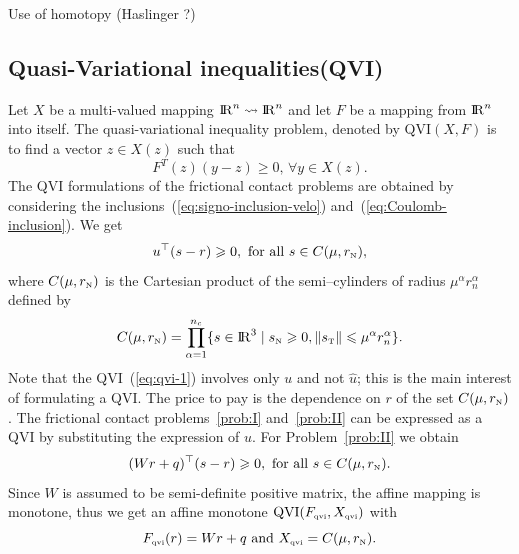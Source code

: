 \begin{ndrva}
  Use of homotopy (Haslinger ?)
\end{ndrva}

\subsection{Quasi-Variational inequalities(QVI)}

Let $X$ be a multi-valued mapping  $\mathrm{I\!R}^{n} \rightsquigarrow  \mathrm{I\!R}^{n}$ and let  $F$ be a mapping from $\mathrm{I\!R}^n$ into itself. The  quasi-variational inequality  problem, denoted by $\mathrm{QVI}(X,F)$ is to find a vector $z\in X(z)$ such that 
\begin{equation}
 \label{eq:qvi}
 F^{T}(z) (y-z) \ge 0, \, \forall y \in X(z).
\end{equation}
The QVI formulations of the frictional contact problems are obtained by considering the inclusions~(\ref{eq:signo-inclusion-velo}) and~(\ref{eq:Coulomb-inclusion}). We get 
\begin{equation}
  \label{eq:qvi-1}
  u^\top (s - r) \geq 0, \text{ for all } s \in C(\mu, r_\n),
\end{equation}
where $C(\mu, r_{\hbox{\tiny{N}}})$ is the Cartesian product of the semi--cylinders of radius $\mu^\alpha r_n^\alpha$ defined by
\begin{equation}
  \label{eq:cylinder}
  C(\mu, r_\n) = \prod_{\alpha =1}^{n_c} \{ s \in \RR^3 \mid  s_\n \geq 0, \|s_\t\| \leq \mu^\alpha r^\alpha_n     \}.
\end{equation}
Note that the QVI~(\ref{eq:qvi-1}) involves only $u$ and not $\hat u$; this is the main interest of formulating a QVI. The price to pay is the dependence on $r$ of the set $C(\mu,r_{\hbox{\tiny{N}}})$. The frictional contact problems~\ref{prob:I} and~\ref{prob:II}  can be expressed as a QVI by substituting the expression of $u$. For Problem~\ref{prob:II} we obtain
\begin{equation}
  \label{eq:qvi-IIbis}
   (Wr+q)^\top (s - r) \geq 0, \text{ for all } s \in C(\mu,r_\n).
\end{equation}
Since $W$ is assumed to be semi-definite positive matrix, the affine mapping is monotone, thus we get an affine monotone $\mathrm{QVI}(F_{{\hbox{\tiny{qvi}}}},X_{{\hbox{\tiny{qvi}}}})$ with
\begin{equation}
  \label{eq:qvi-II}
  F_{\qvitwo}(r) =  Wr+q \text{ and } X_{\qvitwo} = C(\mu,r_\n) .
\end{equation}


